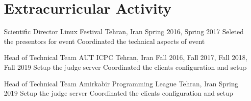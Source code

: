 \section{Extracurricular Activity}


\cventry%
  {Scientific Director}
  {Linux Festival}
  {}
  {Tehran, Iran}
  {Spring 2016, Spring 2017}
  {%
      Seleted the presentors for event
      Coordinated the technical aspects of event
  }

\cventry%
  {Head of Technical Team}
  {AUT ICPC}
  {}
  {Tehran, Iran}
  {Fall 2016, Fall 2017, Fall 2018, Fall 2019}
  {%
      Setup the judge server
      Coordinated the clients configuration and setup
  }

\cventry%
  {Head of Technical Team}
  {Amirkabir Programming League}
  {}
  {Tehran, Iran}
  {Spring 2019}
  {%
      Setup the judge server
      Coordinated the clients configuration and setup
  }
